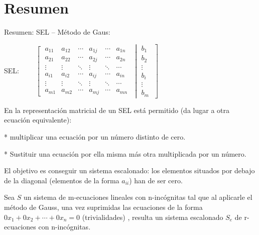 
\clearpage

\section{Resumen}



\begin{myalertblock}{Resumen: SEL -- Método de Gaus:} 

\centerline{
SEL: $\qquad \left[ \begin{matrix}
\; a_{11} & a_{12} & \cdots & a_{1j} & \cdots & a_{1n} \;  \\
\; a_{21} & a_{22} & \cdots & a_{2j} & \cdots & a_{2n} \;  \\
\; \vdots & \vdots & \ddots & \vdots & \ddots & \cdots \;  \\
\; a_{i1} & a_{i2} & \cdots & a_{ij} & \cdots & a_{in} \;  \\
\; \vdots & \vdots & \ddots & \vdots & \ddots & \cdots \;  \\
\; a_{m1} & a_{m2} & \cdots & a_{mj} & \cdots & a_{mn} \;  
\end{matrix} \right.$
$\left| \begin{matrix}
\; b_1 \; \\
\; b_2 \;  \\
\; \vdots \; \\
\; b_i \; \\
\; \vdots \; \\
\; b_m \; 	
\end{matrix} \right]$
}
\justify


\vspace{2mm} En la representación matricial de un SEL está permitido (da lugar a otra ecuación equivalente):
		
	\hspace{3mm} * multiplicar una ecuación por un número distinto de cero.
		
	\hspace{3mm} * Sustituir una ecuación por ella misma más otra multiplicada por un número.
	
El objetivo es conseguir un sistema escalonado: los elementos situados por debajo de la diagonal (elementos de la forma $a_{ii}$) han de ser cero.

Sea $S$ un sistema de m-ecuaciones lineales con n-incógnitas tal que al aplicarle el método de Gauss, una vez suprimidas las ecuaciones de la forma $0x_1+0x_2+\cdots+0x_n=0$ (trivialidades)	, resulta un sistema escalonado $S_e$ de r-ecuaciones con n-incógnitas.


\end{myalertblock}
